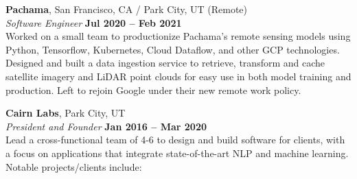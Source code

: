 \documentclass[margin,line]{resume}
\begin{document}
\begin{resume}
    \textbf{Pachama}, San Francisco, CA / Park City, UT (Remote)  \vspace{2mm}\\\vspace{1mm}%
    \textsl{Software Engineer} \hfill \textbf{Jul 2020 -- Feb 2021}\\
    Worked on a small team to productionize Pachama's remote sensing
    models using Python, Tensorflow, Kubernetes, Cloud Dataflow, and other GCP
    technologies. Designed and built a data ingestion service to retrieve,
    transform and cache satellite imagery and LiDAR point clouds for easy use in
    both model training and production. Left to rejoin Google under their new
    remote work policy.

    \textbf{Cairn Labs}, Park City, UT \vspace{2mm}\\\vspace{1mm}%
    \textsl{President and Founder} \hfill \textbf{Jan 2016 -- Mar 2020}\\
    Lead a cross-functional team of 4-6 to design and build software
    for clients, with a focus on applications that integrate
    state-of-the-art NLP and machine learning. Notable projects/clients include:


\end{resume}
\end{document}
